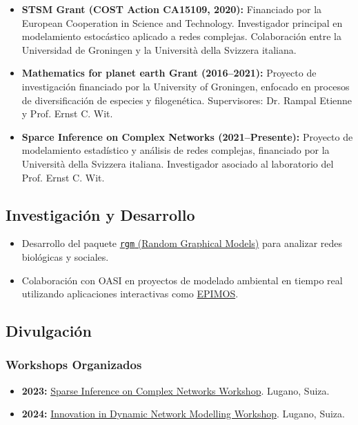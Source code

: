 \documentclass[11pt,a4paper]{article}
\begin{document}
\begin{itemize}
    \item \textbf{STSM Grant (COST Action CA15109, 2020):}  
    Financiado por la European Cooperation in Science and Technology. Investigador principal en modelamiento estocástico aplicado a redes complejas. Colaboración entre la Universidad de Groningen y la Università della Svizzera italiana.
    
    \item \textbf{Mathematics for planet earth Grant (2016--2021):}  
    Proyecto de investigación financiado por la University of Groningen, enfocado en procesos de diversificación de especies y filogenética. Supervisores: Dr. Rampal Etienne y Prof. Ernst C. Wit.
    
    \item \textbf{Sparce Inference on Complex Networks (2021--Presente):}  
    Proyecto de modelamiento estadístico y análisis de redes complejas, financiado por la Università della Svizzera italiana. Investigador asociado al laboratorio del Prof. Ernst C. Wit.
\end{itemize}




\subsection{Investigación y Desarrollo}
\begin{itemize}
    \item Desarrollo del paquete \href{https://cran.r-project.org/web/packages/rgm/index.html}{\texttt{rgm} (Random Graphical Models)} para analizar redes biológicas y sociales.
    \item Colaboración con OASI en proyectos de modelado ambiental en tiempo real utilizando aplicaciones interactivas como \href{https://franciscorichter.shinyapps.io/EPIMOS/}{EPIMOS}.
\end{itemize}

\subsection{Divulgación}

\subsubsection{Workshops Organizados}

\begin{itemize}
    \item \textbf{2023: } \href{https://www.ci.inf.usi.ch/workshop-sparse-inference-on-complex-networks}{Sparse Inference on Complex Networks Workshop}. Lugano, Suiza.
    \item \textbf{2024: } \href{https://www.ci.inf.usi.ch/innodyn/}{Innovation in Dynamic Network Modelling Workshop}. Lugano, Suiza. 
\end{itemize}
\end{document}
